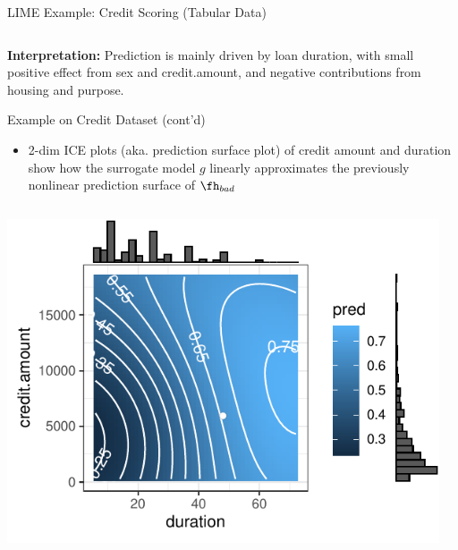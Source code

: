 \documentclass[11pt,compress,t,notes=noshow, aspectratio=169, xcolor=table]{beamer}
\newcommand{\pih}{\fh}
\begin{document}
\begin{frame}{LIME Example: Credit Scoring (Tabular Data)}
\begin{columns}[T,onlytextwidth]
\end{columns}
\textbf{Interpretation:} Prediction is mainly driven by loan duration, with small positive effect from sex and credit.amount, and negative contributions from housing and purpose.
\end{frame}

\begin{frame}{Example on Credit Dataset (cont'd)}

\begin{itemize}	
	\item 2-dim ICE plots (aka. prediction surface plot) of credit amount and duration show how the surrogate model $g$ linearly approximates the previously nonlinear prediction surface of $\pih_{bad}$ 
\end{itemize}
\vspace{-0.4cm}
 \begin{columns}[totalwidth=\textwidth]
	\begin{column}{0.47\textwidth}
		\begin{center}
		\includegraphics[width=1\textwidth]{figure/lime_credit_ice1.pdf}
		\end{center}		
	\end{column}
	\begin{column}{0.46\textwidth}  
		\begin{center}

\end{center}
\end{column}
\end{columns}
\end{frame}
\end{document}
